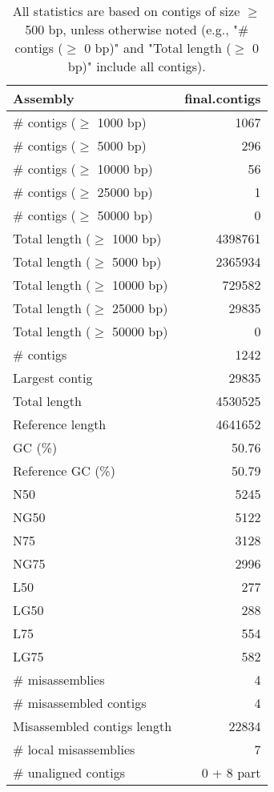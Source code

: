 \documentclass[12pt,a4paper]{article}
\begin{document}
\begin{table}[ht]
\begin{center}
\caption{All statistics are based on contigs of size $\geq$ 500 bp, unless otherwise noted (e.g., "\# contigs ($\geq$ 0 bp)" and "Total length ($\geq$ 0 bp)" include all contigs).}
\begin{tabular}{|l*{1}{|r}|}
\hline
Assembly & final.contigs \\ \hline
\# contigs ($\geq$ 1000 bp) & 1067 \\ \hline
\# contigs ($\geq$ 5000 bp) & 296 \\ \hline
\# contigs ($\geq$ 10000 bp) & 56 \\ \hline
\# contigs ($\geq$ 25000 bp) & 1 \\ \hline
\# contigs ($\geq$ 50000 bp) & 0 \\ \hline
Total length ($\geq$ 1000 bp) & 4398761 \\ \hline
Total length ($\geq$ 5000 bp) & 2365934 \\ \hline
Total length ($\geq$ 10000 bp) & 729582 \\ \hline
Total length ($\geq$ 25000 bp) & 29835 \\ \hline
Total length ($\geq$ 50000 bp) & 0 \\ \hline
\# contigs & 1242 \\ \hline
Largest contig & 29835 \\ \hline
Total length & 4530525 \\ \hline
Reference length & 4641652 \\ \hline
GC (\%) & 50.76 \\ \hline
Reference GC (\%) & 50.79 \\ \hline
N50 & 5245 \\ \hline
NG50 & 5122 \\ \hline
N75 & 3128 \\ \hline
NG75 & 2996 \\ \hline
L50 & 277 \\ \hline
LG50 & 288 \\ \hline
L75 & 554 \\ \hline
LG75 & 582 \\ \hline
\# misassemblies & 4 \\ \hline
\# misassembled contigs & 4 \\ \hline
Misassembled contigs length & 22834 \\ \hline
\# local misassemblies & 7 \\ \hline
\# unaligned contigs & 0 + 8 part \\ \hline

\end{tabular}
\end{center}
\end{table}
\end{document}
